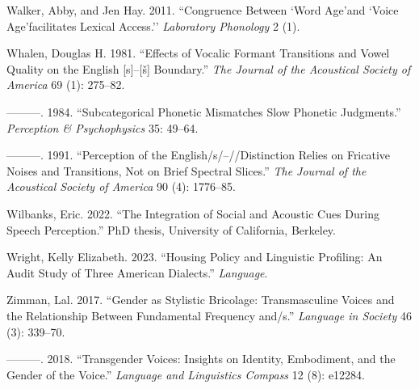 \documentclass[
  letterpaper,
  DIV=11,
  numbers=noendperiod]{scrartcl}
\newlength{\cslhangindent}
\newenvironment{CSLReferences}[2] %
 {\begin{list}{}{%
  \setlength{\itemindent}{0pt}
  \setlength{\leftmargin}{0pt}
  \setlength{\parsep}{0pt}
  \ifodd #1
   \setlength{\leftmargin}{\cslhangindent}
   \setlength{\itemindent}{-1\cslhangindent}
  \fi
  \setlength{\itemsep}{#2\baselineskip}}}
 {\end{list}}
\begin{document}
\begin{CSLReferences}{1}{0}
Walker, Abby, and Jen Hay. 2011. {``Congruence Between `Word Age'and
`Voice Age'facilitates Lexical Access.''} \emph{Laboratory Phonology} 2
(1).

Whalen, Douglas H. 1981. {``Effects of Vocalic Formant Transitions and
Vowel Quality on the English {[}s{]}--{[}{š}{]} Boundary.''} \emph{The
Journal of the Acoustical Society of America} 69 (1): 275--82.

---------. 1984. {``Subcategorical Phonetic Mismatches Slow Phonetic
Judgments.''} \emph{Perception \& {Psychophysics}} 35: 49--64.

---------. 1991. {``Perception of the English/s/--/\int{}/Distinction
Relies on Fricative Noises and Transitions, Not on Brief Spectral
Slices.''} \emph{The Journal of the Acoustical Society of America} 90
(4): 1776--85.

Wilbanks, Eric. 2022. {``The Integration of Social and Acoustic Cues
During Speech Perception.''} PhD thesis, University of California,
Berkeley.

Wright, Kelly Elizabeth. 2023. {``Housing Policy and Linguistic
Profiling: An Audit Study of Three American Dialects.''}
\emph{Language}.

Zimman, Lal. 2017. {``Gender as Stylistic Bricolage: Transmasculine
Voices and the Relationship Between Fundamental Frequency and/s.''}
\emph{Language in Society} 46 (3): 339--70.

---------. 2018. {``Transgender Voices: Insights on Identity,
Embodiment, and the Gender of the Voice.''} \emph{Language and
Linguistics Compass} 12 (8): e12284.

\end{CSLReferences}
\end{document}
